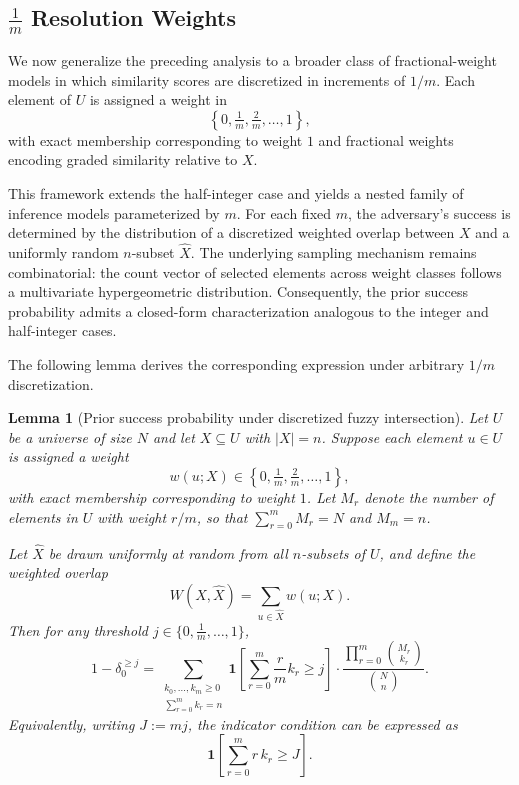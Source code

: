\documentclass[sigconf,anonymous, review]{acmart}
\newtheorem{lemma}[theorem]{Lemma}
\begin{document}
\subsection{\texorpdfstring{$\tfrac{1}{m}$}{1/m} Resolution Weights}

We now generalize the preceding analysis to a broader class of fractional-weight models in which similarity scores are discretized in increments of $1/m$. Each element of $U$ is assigned a weight in
\[
\left\{0, \tfrac{1}{m}, \tfrac{2}{m}, \dots, 1 \right\},
\]
with exact membership corresponding to weight $1$ and fractional weights encoding graded similarity relative to $X$.

This framework extends the half-integer case and yields a nested family of inference models parameterized by $m$. For each fixed $m$, the adversary's success is determined by the distribution of a discretized weighted overlap between $X$ and a uniformly random $n$-subset $\widehat{X}$. The underlying sampling mechanism remains combinatorial: the count vector of selected elements across weight classes follows a multivariate hypergeometric distribution. Consequently, the prior success probability admits a closed-form characterization analogous to the integer and half-integer cases.

The following lemma derives the corresponding expression under arbitrary $1/m$ discretization.


\begin{lemma}[Prior success probability under discretized fuzzy intersection]
Let $U$ be a universe of size $N$ and let $X \subseteq U$ with $|X| = n$.
Suppose each element $u \in U$ is assigned a weight
\[
w(u;X) \in \left\{0,\tfrac1m,\tfrac2m,\dots,1\right\},
\]
with exact membership corresponding to weight $1$.
Let $M_r$ denote the number of elements in $U$ with weight $r/m$, so that
$\sum_{r=0}^m M_r = N$ and $M_m = n$.

Let $\widehat{X}$ be drawn uniformly at random from all $n$-subsets of $U$, and define the weighted overlap
\[
W(X,\widehat{X}) = \sum_{u\in\widehat{X}} w(u;X).
\]
Then for any threshold $j \in \{0,\tfrac1m,\dots,1\}$,
\begin{equation}
\label{eq:discrete_fuzzy_prior}
1-\delta_0^{\ge j}
=
\sum_{\substack{k_0,\dots,k_m \ge 0\\ \sum_{r=0}^m k_r = n}}
\mathbf{1}\!\left[\sum_{r=0}^m \frac{r}{m}k_r \ge j\right]
\cdot
\frac{\prod_{r=0}^m \binom{M_r}{k_r}}{\binom{N}{n}}.
\end{equation}
Equivalently, writing $J := mj$, the indicator condition can be expressed as
\[
\mathbf{1}\!\left[\sum_{r=0}^m r\,k_r \ge J\right].
\]
\end{lemma}
\end{document}
